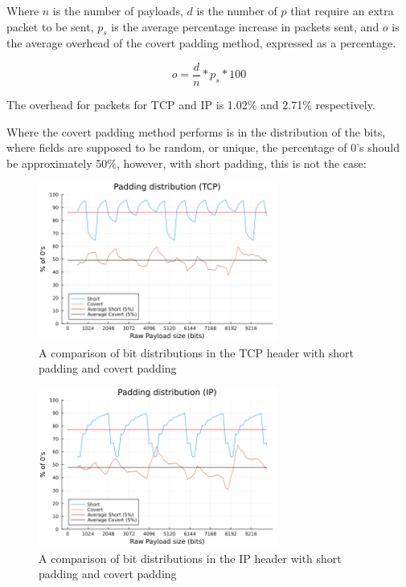Where $n$ is the number of payloads, $d$ is the number of $p$ that require an extra packet to be sent, $p_s$ is the average percentage increase in packets sent, and $o$ is the average overhead of the covert padding method, expressed as a percentage.

\begin{equation*}
    o = \frac{d}{n} * p_s * 100
\end{equation*}

The overhead for packets for TCP and IP is 1.02\% and 2.71\% respectively.

Where the covert padding method performs is in the distribution of the bits, where fields are supposed to be random, or unique, the percentage of 0's should be approximately 50\%, however, with short padding, this is not the case:

\begin{figure}[h]
    \centering
    \includegraphics[width=0.7\textwidth]{fig/padding_distribution_TCP.png}
    \caption{A comparison of bit distributions in the TCP header with short padding and covert padding}
    \label{fig:padding_distribution_TCP}
\end{figure}

\begin{figure}[h]
    \centering
    \includegraphics[width=0.7\textwidth]{fig/padding_distribution_IP.png}
    \caption{A comparison of bit distributions in the IP header with short padding and covert padding}
    \label{fig:padding_distribution_IP}
\end{figure}


